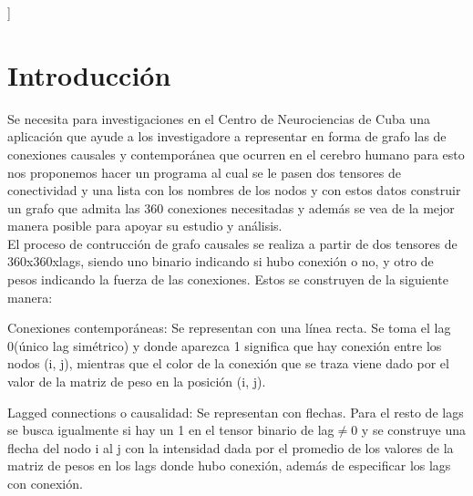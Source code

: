 \documentclass[a4paper,10pt,twocolumn]{article}
\begin{document}


\vspace{0.8cm}
]



\section{Introducción}\label{sec:intro}

Se necesita para investigaciones en el Centro de Neurociencias de Cuba una aplicación que ayude a los investigadore a representar en forma de grafo las de conexiones causales y contemporánea que ocurren en el cerebro humano para esto nos proponemos hacer un programa al cual se le pasen dos tensores de conectividad y una lista con los nombres de los nodos y con estos datos construir un grafo que admita las 360 conexiones necesitadas y además se vea de la mejor manera posible para apoyar su estudio y análisis.\\

El proceso de contrucción de grafo causales se realiza a partir de dos tensores de 360x360xlags, siendo uno binario indicando si hubo conexión o no, y otro de pesos indicando la fuerza de las conexiones. Estos se construyen de la siguiente manera:

\begin{description}


\item	Conexiones contemporáneas: Se representan con una línea recta. Se toma el lag 0(único lag simétrico) y donde aparezca 1 significa que hay conexión entre los nodos (i, j), mientras que el color de la conexión que se traza viene dado por el valor de la matriz de peso en la posición (i, j).\\

\item	Lagged connections o causalidad: Se representan con flechas. Para el resto de lags se busca igualmente si hay un 1 en el tensor binario de 
lag$\neq $0 y se construye una flecha del nodo i al j con la intensidad dada por el promedio de los valores de la matriz de pesos en los lags donde hubo conexión, además de especificar los lags con conexión.\\

\end{description}
\end{document}
